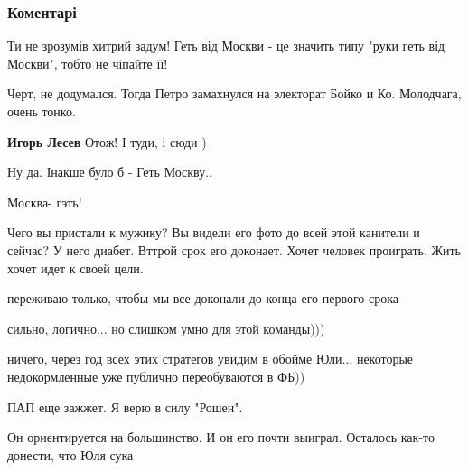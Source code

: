  
 
 
 
 
\subsubsection{Коментарі}
\label{sec:19_11_2018.fb.lesev_igor.1.prochj_ot_moskvy.cmt}

\begin{itemize} %
Ти не зрозумів хитрий задум! Геть від Москви - це значить типу "руки геть від Москви", тобто не чіпайте її!

\begin{itemize} %
Черт, не додумался. Тогда Петро замахнулся на электорат Бойко и Ко. Молодчага, очень тонко.

\textbf{Игорь Лесев} Отож! І туди, і сюди )

Ну да.
Інакше було б - Геть Москву..

Москва- гэть!
\end{itemize} %


Чего вы пристали к мужику? Вы видели его фото до всей этой канители и сейчас? У
него диабет. Вттрой срок его доконает. Хочет человек проиграть. Жить хочет идет
к своей цели.

\begin{itemize} %
переживаю только, чтобы мы все доконали до конца его первого срока
\end{itemize} %


сильно, логично... но слишком умно для этой команды)))

\begin{itemize} %
ничего, через год всех этих стратегов увидим в обойме Юли... некоторые недокормленные уже публично переобуваются в ФБ))
\end{itemize} %

ПАП еще зажжет. Я верю в силу "Рошен".

Он ориентируется на большинство. И он его почти выиграл. Осталось как-то донести, что Юля сука


\end{itemize}
